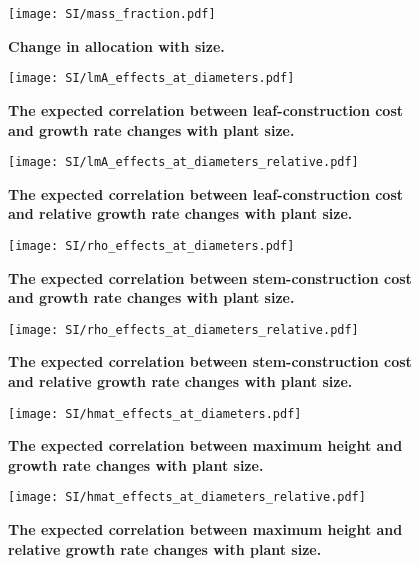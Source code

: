 \documentclass[12pt, a4paper]{article}
\makeatletter
\def\maxwidth{\ifdim\Gin@nat@width>\linewidth\linewidth
\else\Gin@nat@width\fi}
\let\Oldincludegraphics\includegraphics
\renewcommand{\includegraphics}[1]{\Oldincludegraphics[width=\maxwidth]{#1}}
\makeatother
\begin{document}
\begin{appendices}
\newpage

\begin{figure}[ht]
\centering
\texttt{[image: SI/mass\_fraction.pdf]}
\caption{\textbf{Change in allocation with size.}
\label{f-mass_fraction}}
\end{figure}

\newpage

\begin{figure}[ht]
\centering
\texttt{[image: SI/lmA\_effects\_at\_diameters.pdf]}
\caption{\textbf{The expected correlation between leaf-construction cost
and growth rate changes with plant size.} \label{f-lmA_growth_size}}
\end{figure}

\begin{figure}[ht]
\centering
\texttt{[image: SI/lmA\_effects\_at\_diameters\_relative.pdf]}
\caption{\textbf{The expected correlation between leaf-construction cost
and relative growth rate changes with plant size.}
\label{f-lmA_growth_size_relative}}
\end{figure}

\begin{figure}[ht]
\centering
\texttt{[image: SI/rho\_effects\_at\_diameters.pdf]}
\caption{\textbf{The expected correlation between stem-construction cost
and growth rate changes with plant size.} \label{f-rho_growth_size}}
\end{figure}

\begin{figure}[ht]
\centering
\texttt{[image: SI/rho\_effects\_at\_diameters\_relative.pdf]}
\caption{\textbf{The expected correlation between stem-construction cost
and relative growth rate changes with plant size.}
\label{f-rho_growth_size_relative}}
\end{figure}

\begin{figure}[ht]
\centering
\texttt{[image: SI/hmat\_effects\_at\_diameters.pdf]}
\caption{\textbf{The expected correlation between maximum height and
growth rate changes with plant size.} \label{f-hmat_growth_size}}
\end{figure}

\begin{figure}[ht]
\centering
\texttt{[image: SI/hmat\_effects\_at\_diameters\_relative.pdf]}
\caption{\textbf{The expected correlation between maximum height and
relative growth rate changes with plant size.}
\label{f-hmat_growth_size_relative}}
\end{figure}


\end{appendices}
\end{document}
